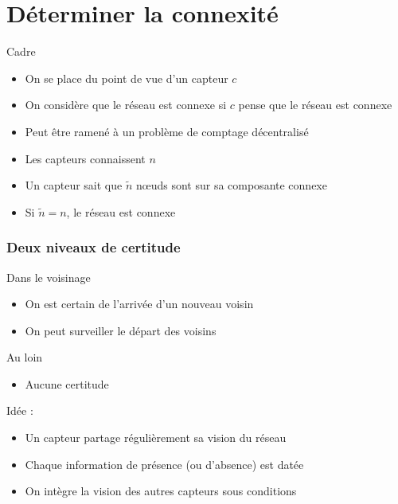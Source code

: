 \documentclass{beamer}
\begin{document}
\section{Déterminer la connexité}

\begin{frame}

  \begin{block}{Cadre}
    \begin{itemize}
      \item{On se place du point de vue d'un capteur $c$}
      \item{On considère que le réseau est connexe si $c$ pense que le réseau
        est connexe}
    \end{itemize}
  \end{block}

  \vfill

  \begin{block}{}
    \begin{itemize}
      \item{Peut être ramené à un problème de comptage décentralisé}
      \item{Les capteurs connaissent $n$}
      \item{Un capteur sait que $\tilde{n}$ n\oe uds sont sur sa
        composante connexe}
      \item{Si $\tilde{n} = n$, le réseau est connexe}
    \end{itemize}
  \end{block}

\end{frame}


\begin{frame}

  \frametitle{Deux niveaux de certitude}

  \begin{block}{Dans le voisinage}
    \begin{itemize}
    \item{On est certain de l'arrivée d'un nouveau voisin}
    \item{On peut surveiller le départ des voisins}
    \end{itemize}
  \end{block}

  \vfill

  \begin{block}{Au loin}
    \begin{itemize}
    \item{Aucune certitude}
    \end{itemize}
  \end{block}

  \vfill

  Idée :
  \begin{itemize}
  \item{Un capteur partage régulièrement sa vision du réseau}
  \item{Chaque information de présence (ou d'absence) est datée}
  \item{On intègre la vision des autres capteurs sous conditions}
  \end{itemize}

\end{frame}
\end{document}
